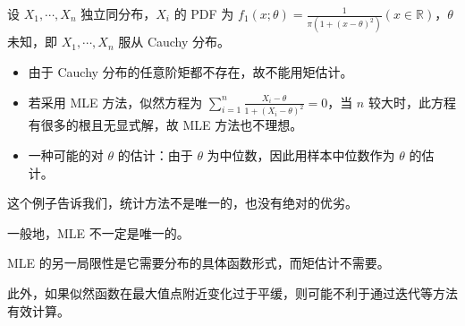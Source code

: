 \documentclass[../main.tex]{subfiles}
\begin{document}
\begin{example}
    设 $X_1,\cdots,X_n$ 独立同分布，$X_i$ 的 PDF 为 $f_1(x;\theta)=\frac1{\pi(1+(x-\theta)^2)}(x\in\mathbb R)$，$\theta$ 未知，即 $X_1,\cdots,X_n$ 服从 Cauchy 分布。
    \begin{itemize}
        \item 由于 Cauchy 分布的任意阶矩都不存在，故不能用矩估计。
        \item 若采用 MLE 方法，似然方程为 $\sum_{i=1}^{n}\frac{X_i-\theta}{1+(X_i-\theta)^2}=0$，当 $n$ 较大时，此方程有很多的根且无显式解，故 MLE 方法也不理想。
        \item 一种可能的对 $\theta$ 的估计：由于 $\theta$ 为中位数，因此用样本中位数作为 $\theta$ 的估计。
    \end{itemize}
\end{example}

这个例子告诉我们，统计方法不是唯一的，也没有绝对的优劣。

一般地，MLE 不一定是唯一的。

MLE 的另一局限性是它需要分布的具体函数形式，而矩估计不需要。

此外，如果似然函数在最大值点附近变化过于平缓，则可能不利于通过迭代等方法有效计算。
\end{document}
